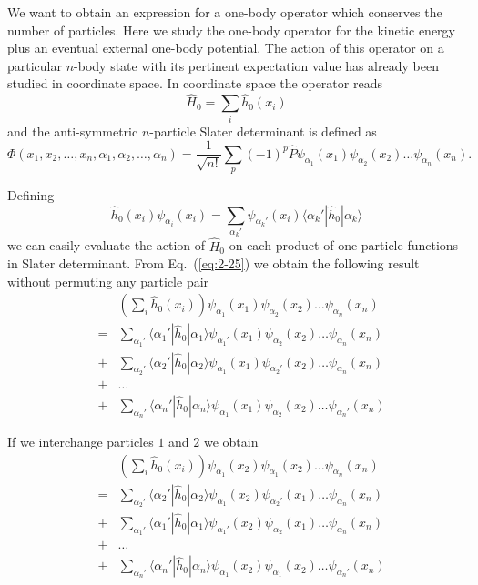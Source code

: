 We want to obtain an expression for a one-body operator which conserves the number of particles.
Here we study the one-body operator for the kinetic energy plus an eventual external one-body potential.
The action of this operator on a particular $n$-body state with its pertinent expectation value has already
been studied in coordinate  space.
In coordinate space the operator reads
\begin{equation}
	\hat{H}_0 = \sum_i \hat{h}_0(x_i) \label{eq:2-23}
\end{equation}
and the anti-symmetric $n$-particle Slater determinant is defined as 
\[
\Phi(x_1, x_2,\dots ,x_n,\alpha_1,\alpha_2,\dots, \alpha_n)= \frac{1}{\sqrt{n!}} \sum_p (-1)^p\hat{P}\psi_{\alpha_1}(x_1)\psi_{\alpha_2}(x_2) \dots \psi_{\alpha_n}(x_n).
\]

Defining
\begin{equation}
	\hat{h}_0(x_i) \psi_{\alpha_i}(x_i) = \sum_{\alpha_k'} \psi_{\alpha_k'}(x_i) \langle\alpha_k'|\hat{h}_0|\alpha_k\rangle \label{eq:2-25}
\end{equation}
we can easily  evaluate the action of $\hat{H}_0$ on each product of one-particle functions in Slater determinant.
From Eq.~(\ref{eq:2-25})  we obtain the following result without  permuting any particle pair 
\begin{align}
	&& \left( \sum_i \hat{h}_0(x_i) \right) \psi_{\alpha_1}(x_1)\psi_{\alpha_2}(x_2) \dots \psi_{\alpha_n}(x_n) \nonumber \\
	& =&\sum_{\alpha_1'} \langle \alpha_1'|\hat{h}_0|\alpha_1\rangle 
		\psi_{\alpha_1'}(x_1)\psi_{\alpha_2}(x_2) \dots \psi_{\alpha_n}(x_n) \nonumber \\
	&+&\sum_{\alpha_2'} \langle \alpha_2'|\hat{h}_0|\alpha_2\rangle
		\psi_{\alpha_1}(x_1)\psi_{\alpha_2'}(x_2) \dots \psi_{\alpha_n}(x_n) \nonumber \\
	&+& \dots \nonumber \\
	&+&\sum_{\alpha_n'} \langle \alpha_n'|\hat{h}_0|\alpha_n\rangle
		\psi_{\alpha_1}(x_1)\psi_{\alpha_2}(x_2) \dots \psi_{\alpha_n'}(x_n) \label{eq:2-26}
\end{align}

If we interchange particles $1$ and $2$  we obtain
\begin{align}
	&& \left( \sum_i \hat{h}_0(x_i) \right) \psi_{\alpha_1}(x_2)\psi_{\alpha_1}(x_2) \dots \psi_{\alpha_n}(x_n) \nonumber \\
	& =&\sum_{\alpha_2'} \langle \alpha_2'|\hat{h}_0|\alpha_2\rangle 
		\psi_{\alpha_1}(x_2)\psi_{\alpha_2'}(x_1) \dots \psi_{\alpha_n}(x_n) \nonumber \\
	&+&\sum_{\alpha_1'} \langle \alpha_1'|\hat{h}_0|\alpha_1\rangle
		\psi_{\alpha_1'}(x_2)\psi_{\alpha_2}(x_1) \dots \psi_{\alpha_n}(x_n) \nonumber \\
	&+& \dots \nonumber \\
	&+&\sum_{\alpha_n'} \langle \alpha_n'|\hat{h}_0|\alpha_n\rangle
		\psi_{\alpha_1}(x_2)\psi_{\alpha_1}(x_2) \dots \psi_{\alpha_n'}(x_n) \label{eq:2-27}
\end{align}

